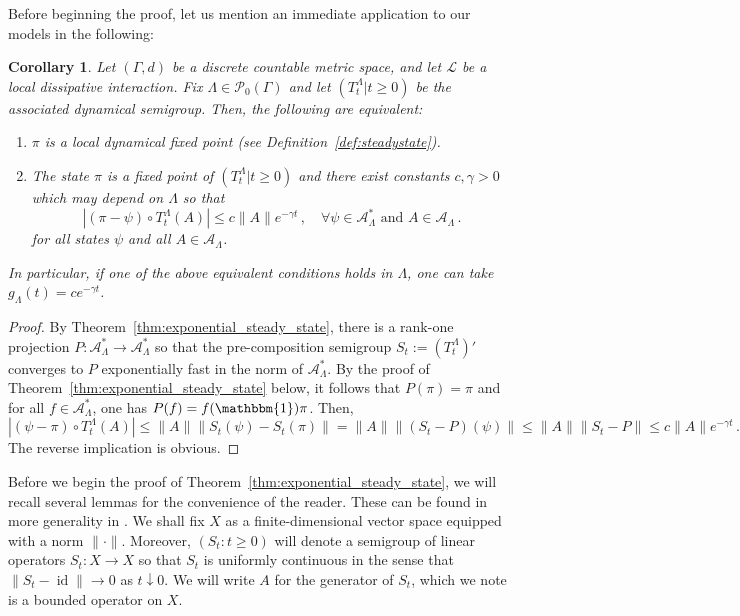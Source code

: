 \documentclass{article}
\DeclareMathOperator{\id}{id}
\newcommand{\A}{\mathcal{A}}
\newcommand{\one}{\mathbbm{1}}
\newcommand{\<}{\langle}
\renewcommand{\>}{\rangle}
\numberwithin{equation}{section}
\newtheorem{cor}[thm]{Corollary}
\theoremstyle{definition}
\begin{document}
Before beginning the proof, let us mention an immediate application to our models in the following: 
\begin{cor}
	Let $(\Gamma, d)$ be a discrete countable metric space, and let $\mathscr{L}$ be a local dissipative interaction. Fix $\Lambda \in \mathcal{P}_0(\Gamma)$ and let $(T^{\Lambda}_t|t\ge0)$ be the associated dynamical semigroup. Then, the following are equivalent:
	\begin{enumerate}
		\item $\pi$ is a local dynamical fixed point (see Definition~\ref{def:steadystate}). 
		\item The state $\pi$ is a fixed point of $(T^{\Lambda}_t|t\ge0)$ and there exist constants $c,\gamma>0$ which may depend on $\Lambda$ so that 
	\begin{equation}
		|(\pi- \psi)\circ T^{\Lambda}_t(A)| \le c \|A\| e^{-\gamma t}\,, \quad \forall \psi \in \A_\Lambda^* \text{ and } A\in \A_{\Lambda}\,.
	\end{equation} for all states $\psi$ and all $A\in \A_{\Lambda}$. 
	\end{enumerate}
	In particular, if one of the above equivalent conditions holds in $\Lambda$, one can take $g_\Lambda(t) = ce^{-\gamma t}$.
\end{cor}
\begin{proof}
By Theorem~\ref{thm:exponential_steady_state}, there is a rank-one projection $P:\A_{\Lambda}^* \to \A_{\Lambda}^*$ so that the pre-composition semigroup $S_t:= (T^{\Lambda}_t)'$ converges to $P$ exponentially fast in the norm of $\A_{\Lambda}^*$. By the proof of Theorem~\ref{thm:exponential_steady_state} below, it follows that $P(\pi) = \pi$ and for all $f\in \A_{\Lambda}^*$, one has $P(f) = f(\one) \pi$. Then, 
	\begin{equation}
		|(\psi - \pi)\circ T^{\Lambda}_t(A)| \le \|A\|  \|S_t(\psi) - S_t(\pi)\| = \|A\| \|(S_t-P)(\psi)\| \le  \|A\| \|S_t - P\| \le c \|A\| e^{-\gamma t} \,.
	\end{equation} The reverse implication is obvious.
\end{proof}

Before we begin the proof of Theorem~\ref{thm:exponential_steady_state}, we will recall several lemmas for the convenience of the reader. These can be found in more generality in \cite{EngelNagel_Short}. We shall fix $X$ as a finite-dimensional vector space equipped with a norm $\| \cdot \|$. Moreover, $(S_t:t\ge 0)$ will denote a semigroup of linear operators $S_t:X\to X$ so that $S_t$ is uniformly continuous in the sense that $\|S_t - \id\| \to 0$ as $t\downarrow 0$. We will write $A$ for the generator of $S_t$, which we note is a bounded operator on $X$.
\end{document}
